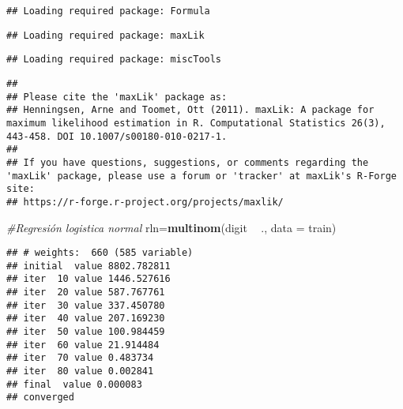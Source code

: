 \documentclass[]{article}
\newenvironment{Shaded}{\begin{snugshade}}{\end{snugshade}}
\newcommand{\KeywordTok}[1]{\textcolor[rgb]{0.13,0.29,0.53}{\textbf{#1}}}
\newcommand{\DataTypeTok}[1]{\textcolor[rgb]{0.13,0.29,0.53}{#1}}
\newcommand{\DecValTok}[1]{\textcolor[rgb]{0.00,0.00,0.81}{#1}}
\newcommand{\StringTok}[1]{\textcolor[rgb]{0.31,0.60,0.02}{#1}}
\newcommand{\CommentTok}[1]{\textcolor[rgb]{0.56,0.35,0.01}{\textit{#1}}}
\newcommand{\OperatorTok}[1]{\textcolor[rgb]{0.81,0.36,0.00}{\textbf{#1}}}
\newcommand{\NormalTok}[1]{#1}
\begin{document}
\begin{verbatim}
## Loading required package: Formula
\end{verbatim}

\begin{verbatim}
## Loading required package: maxLik
\end{verbatim}

\begin{verbatim}
## Loading required package: miscTools
\end{verbatim}

\begin{verbatim}
## 
## Please cite the 'maxLik' package as:
## Henningsen, Arne and Toomet, Ott (2011). maxLik: A package for maximum likelihood estimation in R. Computational Statistics 26(3), 443-458. DOI 10.1007/s00180-010-0217-1.
## 
## If you have questions, suggestions, or comments regarding the 'maxLik' package, please use a forum or 'tracker' at maxLik's R-Forge site:
## https://r-forge.r-project.org/projects/maxlik/
\end{verbatim}

\begin{Shaded}
\begin{Highlighting}[]
\CommentTok{#Regresión logistica normal}
\NormalTok{rln=}\KeywordTok{multinom}\NormalTok{(digit }\OperatorTok{~}\StringTok{ }\NormalTok{., }\DataTypeTok{data =}\NormalTok{ train)}
\end{Highlighting}
\end{Shaded}

\begin{verbatim}
## # weights:  660 (585 variable)
## initial  value 8802.782811 
## iter  10 value 1446.527616
## iter  20 value 587.767761
## iter  30 value 337.450780
## iter  40 value 207.169230
## iter  50 value 100.984459
## iter  60 value 21.914484
## iter  70 value 0.483734
## iter  80 value 0.002841
## final  value 0.000083 
## converged
\end{verbatim}

\begin{Shaded}
\end{Shaded}
\end{document}
